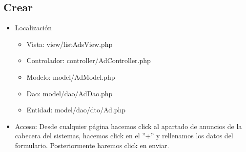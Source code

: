 \subsection{Crear}
\begin{itemize}
\item Localizaci\'{o}n
\begin{itemize}
\item Vista: view/listAdsView.php
\item Controlador: controller/AdController.php
\item Modelo: model/AdModel.php
\item Dao: model/dao/AdDao.php
\item Entidad: model/dao/dto/Ad.php
\end{itemize}
\item Acceso: Desde cualquier p\'{a}gina hacemos click al apartado de anuncios de la cabecera del sistemas, hacemos click en el ''+'' y rellenamos los datos del formulario. Posteriormente haremos click en enviar.
\end{itemize}
